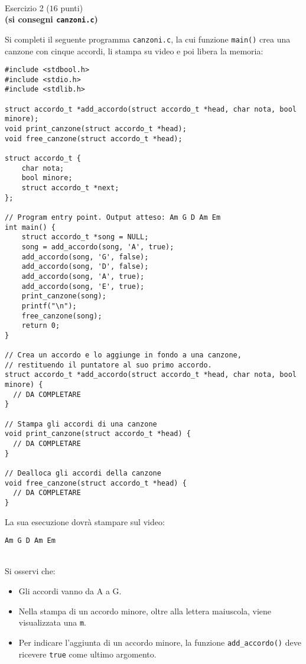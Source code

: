\documentclass[12pt]{article}
\begin{document}
\newpage
\mbox{}\\
\begin{center}{\Large Esercizio 2} ($16$ punti)\\
  \textbf{(si consegni \texttt{canzoni.c})}\end{center}
Si completi il seguente programma \texttt{canzoni.c}, la cui funzione \texttt{main()} crea una canzone con cinque accordi, li stampa su video e poi libera la memoria:

\begin{center}
\begin{lstlisting}[language=myC]
#include <stdbool.h>
#include <stdio.h>
#include <stdlib.h>

struct accordo_t *add_accordo(struct accordo_t *head, char nota, bool minore);
void print_canzone(struct accordo_t *head);
void free_canzone(struct accordo_t *head);

struct accordo_t {
    char nota;
    bool minore;
    struct accordo_t *next;
};

// Program entry point. Output atteso: Am G D Am Em
int main() {
    struct accordo_t *song = NULL;
    song = add_accordo(song, 'A', true);
    add_accordo(song, 'G', false);
    add_accordo(song, 'D', false);
    add_accordo(song, 'A', true);
    add_accordo(song, 'E', true);
    print_canzone(song);
    printf("\n");
    free_canzone(song);
    return 0;
}

// Crea un accordo e lo aggiunge in fondo a una canzone,
// restituendo il puntatore al suo primo accordo.
struct accordo_t *add_accordo(struct accordo_t *head, char nota, bool minore) {
  // DA COMPLETARE
}

// Stampa gli accordi di una canzone
void print_canzone(struct accordo_t *head) {
  // DA COMPLETARE
}

// Dealloca gli accordi della canzone
void free_canzone(struct accordo_t *head) {
  // DA COMPLETARE
}
\end{lstlisting}
\end{center}
La sua esecuzione dovr\`a stampare sul video:
\begin{mdframed}[backgroundcolor=lightgrey] 
\begin{verbatim}
Am G D Am Em
\end{verbatim}
\end{mdframed}

\mbox{}\\
Si osservi che:
\begin{itemize}
\item Gli accordi vanno da A a G.
\item Nella stampa di un accordo minore, oltre alla lettera maiuscola, viene visualizzata una \texttt{m}.
\item Per indicare l'aggiunta di un accordo minore, la funzione
  \texttt{add\_accordo()} deve ricevere \texttt{true} come ultimo argomento.
\end{itemize}
\end{document}
